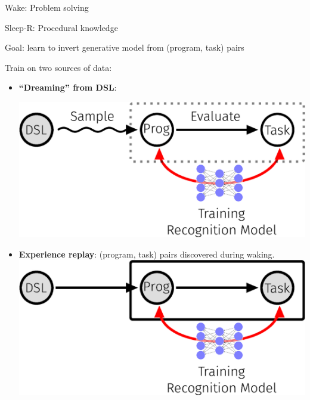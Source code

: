 \documentclass[final]{beamer}
\newlength{\onecolwid}
\begin{document}
\begin{frame}[t]
\begin{columns}[t]
\begin{column}{\onecolwid}
\begin{block}{Wake: Problem solving}

  

\end{block}



\begin{block}{Sleep-R: Procedural knowledge}

  Goal: learn to invert generative model from (program, task) pairs  


Train on two sources of data:

  \begin{itemize}
  \item \textbf{``Dreaming'' from DSL}:

    \includegraphics[width = 20cm]{figures/animation/Sleep-R-2.eps}
  \item \textbf{Experience replay}: (program, task) pairs discovered during waking.
  \includegraphics[width = 20cm]{figures/animation/Sleep-R-1.eps}    
  \end{itemize}
  


\end{block}
\end{column}
\end{columns}
\end{frame}
\end{document}
